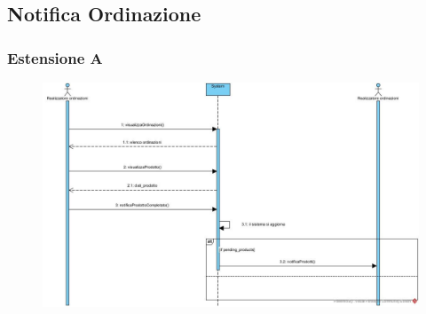 \subsection{Notifica Ordinazione}
\subsubsection{Estensione A}
\begin{figure}[H]
	\centering
	\includegraphics[width=1\textwidth]{Immagini/SSD Notifica Ordinazione.jpg}
\end{figure}
